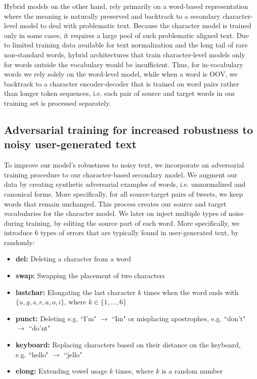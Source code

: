 \documentclass[letterpaper]{article} \usepackage{aaai19}  \usepackage{times}  \usepackage{helvet} \usepackage{courier}  \usepackage[hyphens]{url}  \usepackage{graphicx} \urlstyle{rm} \def\UrlFont{\rm}  \usepackage{graphicx}  \frenchspacing  \setlength{\pdfpagewidth}{8.5in}  \setlength{\pdfpageheight}{11in}
\begin{document}
Hybrid models on the other hand, rely primarily on a word-based representation where the meaning is naturally preserved and backtrack to a secondary character-level model to deal with problematic text. Because the character model is trained only in some cases, it requires a large pool of such problematic aligned text. Due to limited training data available for text normalization and the long tail of rare non-standard words, hybrid architectures that train character-level models only for words outside the vocabulary would be insufficient. Thus, for in-vocabulary words we rely solely on the word-level model, while when a word is OOV, we backtrack to a character encoder-decoder that is trained on word pairs rather than longer token sequences, i.e. each pair of source and target words in our training set is processed separately. 

\subsection{Adversarial training for increased robustness to noisy user-generated text}
To improve our model's robustness to noisy text, we incorporate an adversarial training procedure to our character-based secondary model. We augment our data by  creating synthetic adversarial examples of words, i.e. unnormalized and canonical forms. More specifically, for all source-target pairs of tweets, we keep words that remain unchanged. This process creates our source and target vocabularies for the character model. We later on inject multiple types of noise during training, by editing the source part of each word. More specifically, we introduce 6 types of errors that are typically found in user-generated text, by randomly:

\begin{itemize}
    \item[]\textbf{del:} Deleting a character from a word
    \item[]\textbf{swap:}  Swapping the placement of two characters 
    \item[]\textbf{lastchar:}  Elongating the last character $k$ times when the word ends with $\{u, y, s, r, a, o, i\}$, where $k \in \{1,\dots,6\}$ 
    \item[]\textbf{punct:}  Deleting  e.g. ``I'm" $\rightarrow$ ``Im"  or misplacing apostrophes, e.g. ``don't" $\rightarrow$ ``do'nt" 
    \item[]\textbf{keyboard:}  Replacing characters based on their distance on the keyboard, e.g. ``hello" $\rightarrow$ ``jello"
    \item[]\textbf{elong:}  Extending vowel usage $k$ times, where $k$ is a random number
\end{itemize}
\end{document}
